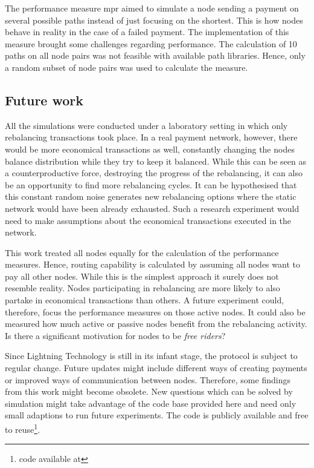 \documentclass[final]{fhnwreport}       %
\begin{document}
The performance measure \gls{mpr} aimed to simulate a node sending a payment on several possible paths instead of just focusing on the shortest. This is how nodes behave in reality in the case of a failed payment. The implementation of this measure brought some challenges regarding performance. The calculation of 10 paths on all node pairs was not feasible with available path libraries. Hence, only a random subset of node pairs was used to calculate the measure.

\subsection{Future work}
All the simulations were conducted under a laboratory setting in which only rebalancing transactions took place. In a real payment network, however, there would be more economical transactions as well, constantly changing the nodes balance distribution while they try to keep it balanced. While this can be seen as a counterproductive force, destroying the progress of the rebalancing, it can also be an opportunity to find more rebalancing cycles. It can be hypothesised that this constant random noise generates new rebalancing options where the static network would have been already exhausted. Such a research experiment would need to make assumptions about the economical transactions executed in the network.

This work treated all nodes equally for the calculation of the performance measures. Hence, routing capability is calculated by assuming all nodes want to pay all other nodes. While this is the simplest approach it surely does not resemble reality. Nodes participating in rebalancing are more likely to also partake in economical transactions than others. A future experiment could, therefore, focus the performance measures on those active nodes. It could also be measured how much active or passive nodes benefit from the rebalancing activity. Is there a significant motivation for nodes to be \emph{free riders}?

Since Lightning Technology is still in its infant stage, the protocol is subject to regular change. Future updates might include different ways of creating payments or improved ways of communication between nodes. Therefore, some findings from this work might become obsolete. New questions which can be solved by simulation might take advantage of the code base provided here and need only small adaptions to run future experiments. The code is publicly available and free to reuse\footnote{code available at \githubsim}.
\end{document}
